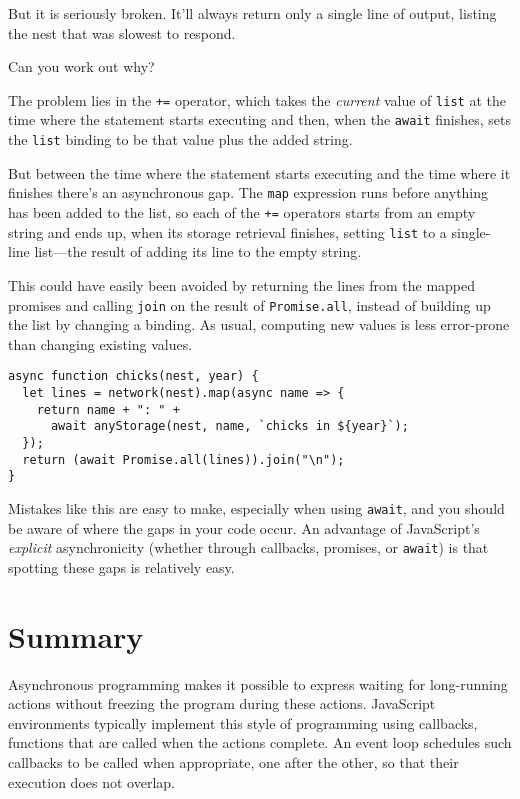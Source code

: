 But it is seriously broken. It'll always return only a single line of output, listing the nest that was slowest to respond.

Can you work out why?

The problem lies in the \lstinline`+=` operator, which takes the \emph{current} value of \lstinline`list` at the time where the statement starts executing and then, when the \lstinline`await` finishes, sets the \lstinline`list` binding to be that value plus the added string.

But between the time where the statement starts executing and the time where it finishes there's an asynchronous gap. The \lstinline`map` expression runs before anything has been added to the list, so each of the \lstinline`+=` operators starts from an empty string and ends up, when its storage retrieval finishes, setting \lstinline`list` to a single-line list—the result of adding its line to the empty string.

This could have easily been avoided by returning the lines from the mapped promises and calling \lstinline`join` on the result of \lstinline`Promise.all`, instead of building up the list by changing a binding. As usual, computing new values is less error-prone than changing existing values.

\begin{lstlisting}
async function chicks(nest, year) {
  let lines = network(nest).map(async name => {
    return name + ": " +
      await anyStorage(nest, name, `chicks in ${year}`);
  });
  return (await Promise.all(lines)).join("\n");
}
\end{lstlisting}
\noindent

Mistakes like this are easy to make, especially when using \lstinline`await`, and you should be aware of where the gaps in your code occur. An advantage of JavaScript's \emph{explicit} asynchronicity (whether through callbacks, promises, or \lstinline`await`) is that spotting these gaps is relatively easy.

\section{Summary}

Asynchronous programming makes it possible to express waiting for long-running actions without freezing the program during these actions. JavaScript environments typically implement this style of programming using callbacks, functions that are called when the actions complete. An event loop schedules such callbacks to be called when appropriate, one after the other, so that their execution does not overlap.

